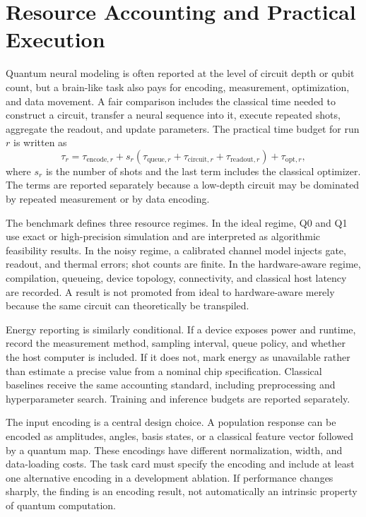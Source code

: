 \documentclass[conference]{IEEEtran}
\begin{document}
\section{Resource Accounting and Practical Execution}
\label{sec:resources}

Quantum neural modeling is often reported at the level of circuit depth or qubit count,
but a brain-like task also pays for encoding, measurement, optimization, and data
movement. A fair comparison includes the classical time needed to construct a circuit,
transfer a neural sequence into it, execute repeated shots, aggregate the readout, and
update parameters. The practical time budget for run $r$ is written as
\begin{equation}
\tau_r=\tau_{\mathrm{encode},r}+s_r(\tau_{\mathrm{queue},r}+\tau_{\mathrm{circuit},r}+\tau_{\mathrm{readout},r})+\tau_{\mathrm{opt},r},
\label{eq:wallclock}
\end{equation}
where $s_r$ is the number of shots and the last term includes the classical optimizer.
The terms are reported separately because a low-depth circuit may be dominated by
repeated measurement or by data encoding.

The benchmark defines three resource regimes. In the ideal regime, Q0 and Q1 use exact
or high-precision simulation and are interpreted as algorithmic feasibility results. In
the noisy regime, a calibrated channel model injects gate, readout, and thermal errors;
shot counts are finite. In the hardware-aware regime, compilation, queueing, device
topology, connectivity, and classical host latency are recorded. A result is not
promoted from ideal to hardware-aware merely because the same circuit can theoretically
be transpiled.

Energy reporting is similarly conditional. If a device exposes power and runtime,
record the measurement method, sampling interval, queue policy, and whether the host
computer is included. If it does not, mark energy as unavailable rather than estimate a
precise value from a nominal chip specification. Classical baselines receive the same
accounting standard, including preprocessing and hyperparameter search. Training and
inference budgets are reported separately.

The input encoding is a central design choice. A population response can be encoded as
amplitudes, angles, basis states, or a classical feature vector followed by a quantum
map. These encodings have different normalization, width, and data-loading costs. The
task card must specify the encoding and include at least one alternative encoding in a
development ablation. If performance changes sharply, the finding is an encoding
result, not automatically an intrinsic property of quantum computation.
\end{document}
